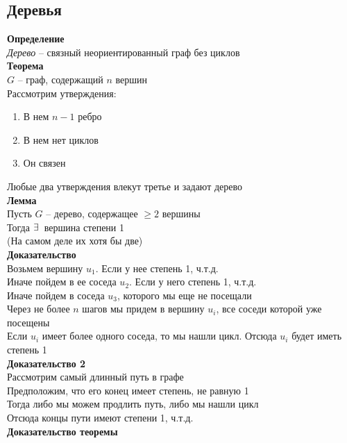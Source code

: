 \documentclass[12pt]{article}
\begin{document}
\subsection{Деревья}
\textbf{Определение}\\
\textit{Дерево} -- связный неориентированный граф без циклов\\
\textbf{Теорема}\\
$G$ -- граф, содержащий $n$ вершин\\
Рассмотрим утверждения:
\begin{enumerate}
    \item В нем $n-1$ ребро
    \item В нем нет циклов
    \item Он связен
\end{enumerate}
Любые два утверждения влекут третье и задают дерево\\
\textbf{Лемма}\\
Пусть $G$ -- дерево, содержащее $\geq 2$ вершины\\
Тогда $\exists\,$ вершина степени 1\\
(На самом деле их хотя бы две)\\
\textbf{Доказательство}\\
Возьмем вершину $u_1$. Если у нее степень 1, ч.т.д.\\
Иначе пойдем в ее соседа $u_2$. Если у него степень 1, ч.т.д.\\
Иначе пойдем в соседа $u_3$, которого мы еще не посещали\\
Через не более $n$ шагов мы придем в вершину $u_i$, все соседи которой уже посещены\\
Если $u_i$ имеет более одного соседа, то мы нашли цикл. Отсюда $u_i$ будет иметь степень 1\\
\textbf{Доказательство 2}\\
Рассмотрим самый длинный путь в графе\\
Предположим, что его конец имеет степень, не равную 1\\
Тогда либо мы можем продлить путь, либо мы нашли цикл\\
Отсюда концы пути имеют степени 1, ч.т.д.\\
\textbf{Доказательство теоремы}
\end{document}
